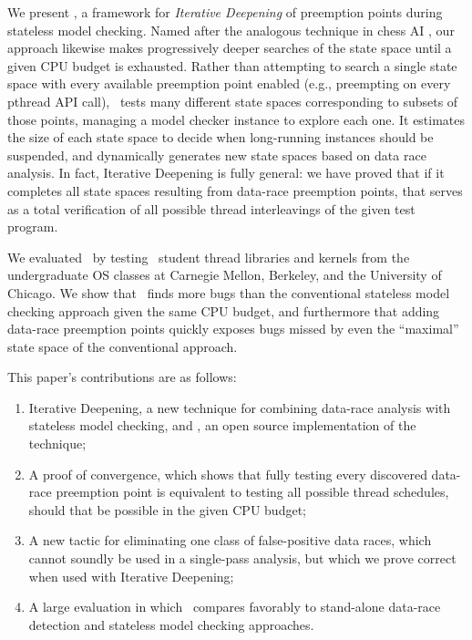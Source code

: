 
We present \quicksand, a framework for {\em Iterative Deepening} of preemption points during stateless model checking.
Named after the analogous technique in chess AI \cite{iterative-deepening-chess-ai}, our approach likewise makes progressively deeper searches of the state space until a given CPU budget is exhausted.
Rather than attempting to search a single state space with every available preemption point enabled (e.g., preempting on every pthread API call),
\quicksand~tests many different state spaces corresponding to subsets of those points, managing a model checker instance to explore each one.
It estimates the size of each state space to decide when long-running instances should be suspended, and dynamically generates new state spaces based on data race analysis.
In fact, Iterative Deepening is fully general:
we have proved that if it completes all state spaces resulting from data-race preemption points,
that serves as a total verification of all possible thread interleavings of the given test program.

We evaluated \quicksand~by testing \numstudence~student thread libraries and kernels from the undergraduate OS classes at Carnegie Mellon, Berkeley, and the University of Chicago.
We show that \quicksand~finds more bugs than the conventional stateless model checking approach given the same CPU budget,
and furthermore that adding data-race preemption points quickly exposes bugs missed by even the ``maximal'' state space of the conventional approach.

This paper's contributions are as follows:
\begin{enumerate}
	\item Iterative Deepening, a new technique for combining data-race analysis with stateless model checking, and \quicksand, an open source implementation of the technique;
	\item A proof of convergence, which shows that fully testing every discovered data-race preemption point is equivalent to testing all possible thread schedules, should that be possible in the given CPU budget;
	\item A new tactic for eliminating one class of false-positive data races,
		which cannot soundly be used in a single-pass analysis,
		but which we prove correct when used with Iterative Deepening;
	\item A large evaluation in which \quicksand~compares favorably to stand-alone data-race detection and stateless model checking approaches.
\end{enumerate}

